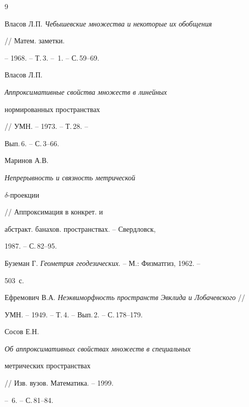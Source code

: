 \begin{thebibliography}{9}







Власов Л.П. {\em Чебышевские множества и некоторые их обобщения}


// Матем. заметки.


-- 1968. -- Т.\,3. -- \No\,1. -- С.\,59--69.




Власов Л.П. {\em Аппроксимативные свойства множеств в линейных


нормированных пространствах} // УМН. -- 1973. -- Т.\,28. --


Вып.\,6. -- С.\,3--66.




Маринов А.В. {\em Непрерывность и связность метрической


$\delta$-проекции} // Аппроксимация в конкрет. и 


абстракт. банахов. пространствах. -- Свердловск,


1987. -- С.\,82--95.




Буземан Г. {\em Геометрия геодезических}. -- М.: Физматгиз, 1962. --


503~с.




Ефремович В.А. {\em Неэквиморфность пространств Эвклида и Лобачевского} //


УМН. -- 1949. -- Т.\,4. -- Вып.\,2. -- С.\,178--179.




Сосов Е.Н. {\em Об аппроксимативных свойствах множеств в специальных


метрических пространствах} // Изв. вузов. Математика. -- 1999.


-- \No\,6. -- С.\,81--84.





\end{thebibliography}





\vskip 2cm












\label{end}











